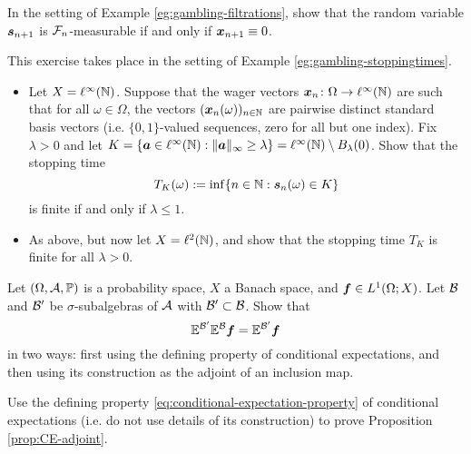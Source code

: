 \begin{exercise}\label{ex:winnings-unpredictability}
  In the setting of Example \ref{eg:gambling-filtrations}, show that the random variable $\bm{s}_{n+1}$ is $\mathcal{F}_n$-measurable if and only if $\bm{x}_{n+1} \equiv 0$.
\end{exercise}

\begin{exercise}\label{ex:gambling-in-linfty}
  This exercise takes place in the setting of Example \ref{eg:gambling-stoppingtimes}.
  \begin{itemize}
  \item
    Let $X = \ell^\infty(\mathbb{N})$.
    Suppose that the wager vectors $\bm{x}_n \colon \Omega \rightarrow \ell^\infty(\mathbb{N})$ are such that for all $\omega \in \Omega$, the vectors $(\bm{x}_n(\omega))_{n \in \mathbb{N}}$ are pairwise distinct standard basis vectors (i.e. $\{0,1\}$-valued sequences, zero for all but one index).
    Fix $\lambda > 0$ and let $K = \{\bm{a} \in \ell^\infty(\mathbb{N}) : \|\bm{a}\|_\infty \geq \lambda\} = \ell^\infty(\mathbb{N}) \setminus B_\lambda(0)$.
    Show that the stopping time
    \begin{equation*}
      T_K(\omega) := \inf\{n \in \mathbb{N} : \bm{s}_n(\omega) \in K\} 
    \end{equation*}
    is finite if and only if $\lambda \leq 1$.
  \item
    As above, but now let $X = \ell^2(\mathbb{N})$, and show that the stopping time $T_K$ is finite for all $\lambda > 0$.
  \end{itemize}
\end{exercise}

\begin{exercise}\label{ex:CE-monotonicity}
  Let $(\Omega,\mathcal{A},\mathbb{P})$ is a probability space, $X$ a Banach space, and $\bm{f} \in L^1(\Omega;X)$.
  Let $\mathcal{B}$ and $\mathcal{B}'$ be $\sigma$-subalgebras of $\mathcal{A}$ with $\mathcal{B}' \subset \mathcal{B}$.
  Show that
  \begin{equation*}
    \mathbb{E}^{\mathcal{B}'} \mathbb{E}^{\mathcal{B}} \bm{f} = \mathbb{E}^{\mathcal{B}'} \bm{f}
  \end{equation*}
  in two ways: first using the defining property of conditional expectations, and then using its construction as the adjoint of an inclusion map.
\end{exercise}

\begin{exercise}\label{ex:CE-adjoint}
  Use the defining property \eqref{eq:conditional-expectation-property} of conditional expectations (i.e. do not use details of its construction) to prove Proposition \ref{prop:CE-adjoint}.
\end{exercise}

